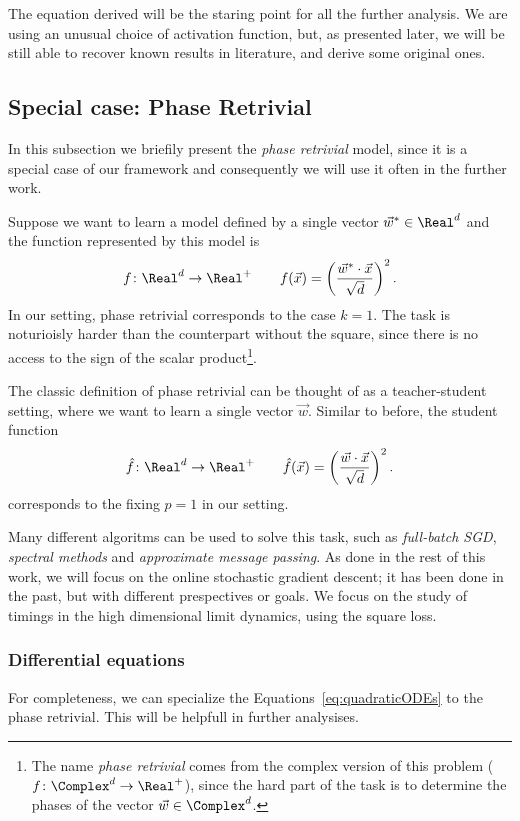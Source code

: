 The equation derived will be the staring point for all the further analysis.
We are using an unusual choice of activation function, but, as presented later,
we will be still able to recover known results in literature, and derive some original
ones.

\subsection{Special case: Phase Retrivial}\label{subsec:phase_retrivial}
In this subsection we briefily present the \emph{phase retrivial} model,
since it is a special case of our framework and consequently we will use it often in the further work.

Suppose we want to learn a model defined by 
a single vector \(\vec{w}^* \in \Real^d\) and the function represented by this model is 
\[
  f\colon \Real^d \to \Real^+ \qquad f{(\vec{x})} = \left(\frac{\vec{w}^*\cdot\vec{x}}{\sqrt{d}}\right)^2.
\]
In our setting, phase retrivial corresponds to the case \(k=1\). The task is noturioisly
harder than the counterpart without the square, since there is no access to the sign of 
the scalar product\footnote{
  The name \emph{phase retrivial} comes from the complex version of this problem (\(f\colon \Complex^d \to \Real^+\)),
  since the hard part of the task is to determine the phases of the vector \(\vec{w}\in\Complex^d\).
}.

The classic definition of phase retrivial can be thought of as a teacher-student setting, where we want to learn
a single vector \(\vec{w}\). Similar to before, the student function 
\[
  \hat{f}\colon \Real^d \to \Real^+ \qquad \hat{f}{(\vec{x})} = \left(\frac{\vec{w}\cdot\vec{x}}{\sqrt{d}}\right)^2.
\]
corresponds to the fixing \(p=1\) in our setting. 

Many different algoritms can be used to solve this task, such as 
\emph{full-batch SGD}\cite{mignacco2021stochasticity},
\emph{spectral methods}\cite{mondelli2018fundamental} and 
\emph{approximate message passing}\cite{maillard2020phase}.
As done in the rest of this work, we will focus on the online stochastic gradient descent;
it has been done in the past\cite{sarao2020complex,sarao2020optimization},
but with different prespectives or goals. 
We focus on the study of timings in the high dimensional limit dynamics,
using the square loss.

\subsubsection{Differential equations}
For completeness, we can specialize the Equations~\eqref{eq:quadraticODEs} to the phase retrivial.
This will be helpfull in further analysises.

